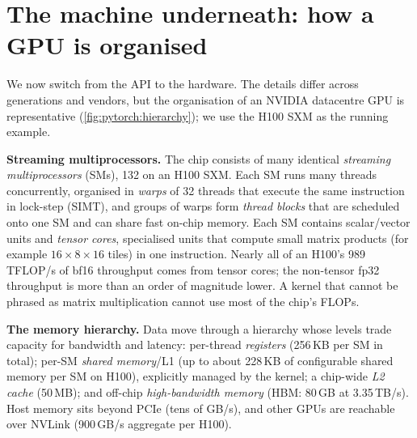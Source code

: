 \section{The machine underneath: how a GPU is organised}\label{sec:pytorch:gpuarch}

We now switch from the API to the hardware. The details differ across generations and vendors, but the
organisation of an NVIDIA datacentre GPU is representative (\cref{fig:pytorch:hierarchy}); we use the H100
SXM as the running example.

\textbf{Streaming multiprocessors.} The chip consists of many identical \emph{streaming multiprocessors}
(SMs), 132 on an H100 SXM. Each SM runs many threads concurrently, organised in \emph{warps} of 32 threads that
execute the same instruction in lock-step (SIMT), and groups of warps form \emph{thread blocks} that are
scheduled onto one SM and can share fast on-chip memory. Each SM contains scalar/vector units and
\emph{tensor cores}, specialised units that compute small matrix products (for example $16\times8\times16$ tiles) in
one instruction. Nearly all of an H100's 989\,TFLOP/s of bf16 throughput comes from tensor cores; the
non-tensor fp32 throughput is more than an order of magnitude lower. A kernel that cannot be phrased as
matrix multiplication cannot use most of the chip's FLOPs.

\textbf{The memory hierarchy.} Data move through a hierarchy whose levels trade capacity for bandwidth and
latency: per-thread \emph{registers} (256\,KB per SM in total); per-SM \emph{shared memory}/L1 (up to about
228\,KB of configurable shared memory per SM on H100), explicitly managed by the kernel; a chip-wide \emph{L2
cache} (50\,MB); and off-chip \emph{high-bandwidth memory} (HBM: 80\,GB at 3.35\,TB/s). Host memory sits beyond
PCIe (tens of GB/s), and other GPUs are reachable over NVLink (900\,GB/s aggregate per H100).

